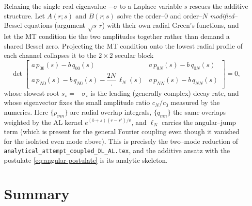 \documentclass{article}
\begin{document}
Relaxing the single real eigenvalue $-\sigma$ to a Laplace variable $s$ rescues
the additive structure. Let $A(r;s)$ and $B(r;s)$ solve the order--$0$ and
order--$N$ \emph{modified}--Bessel equations (argument $\sqrt s\,r$) with their
own radial Green's functions, and let the MT condition tie the two amplitudes
together rather than demand a shared Bessel zero. Projecting the MT condition
onto the lowest radial profile of each channel collapses it to the $2\times2$
secular block
\begin{equation}
\det
\begin{bmatrix}
a\,p_{00}(s)-b\,q_{00}(s) & a\,p_{0N}(s)-b\,q_{0N}(s)\\[4pt]
a\,p_{N0}(s)-b\,q_{N0}(s)-\dfrac{2N}{\,\cdot\,}\,\ell_N(s)
& a\,p_{NN}(s)-b\,q_{NN}(s)
\end{bmatrix}=0,
\label{eq:2x2}
\end{equation}
whose slowest root $s_\star=-\sigma_\star$ is the leading (generally complex)
decay rate, and whose eigenvector fixes the small amplitude ratio $c_N/c_0$
measured by the numerics. Here $\{p_{mn}\}$ are radial overlap integrals,
$\{q_{mn}\}$ the same overlaps weighted by the AL kernel $e^{(b+s)(r-r')/v}$, and
$\ell_N$ carries the angular--jump term (which is present for the general Fourier
coupling even though it vanished for the isolated even mode above). This is
precisely the two--mode reduction of
\texttt{analytical\_attempt\_coupled\_DL\_AL.tex}, and the additive ansatz with
the postulate \eqref{eq:angular-postulate} is its analytic skeleton.

\section{Summary}
\end{document}
